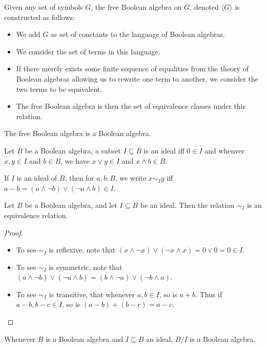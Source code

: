 \begin{definition}
  Given any set of symbols $G$, the free Boolean algebra on $G$, denoted $\langle G \rangle$
  is constructed as follows:
  \begin{itemize}
    \item We add $G$ as set of constants to the language of Boolean algebras. 
    \item We consider the set of terms in this language. 
    \item If there merely exists some finite sequence of 
      equalities from the theory of Boolean algebras allowing us to rewrite one term to another, 
      we consider the two terms to be equivalent. 
    \item The free Boolean algebra is then the set of equivalence classes under this relation. 
  \end{itemize}
\end{definition}
\begin{remark}
  The free Boolean algebra is a Boolean algebra. 
\end{remark}
\begin{definition}
  Let $B$ be a Boolean algebra, a subset $I\subseteq B$ is an ideal iff 
  $0\in I$ and whenver $x,y \in I$ and $b\in B$, we have $x\vee y \in I$ and $x \wedge b \in B$. 

  If $I$ is an ideal of $B$, then for $a,b:B$, we write $x\sim_I y$ iff 
  $a - b  = 
  (a \wedge \neg b ) \vee ( \neg a \wedge b) 
  \in I$. 
\end{definition}
\begin{lemma}
  Let $B$ be a Boolean algebra, and let $I\subseteq B$ be an ideal. 
  Then the relation $\sim_I$ is an equivalence relation. 
\end{lemma}
\begin{proof}
  \begin{itemize}
    \item To see $\sim_I$ is reflexive, note that 
      $(x \wedge \neg x) \vee (\neg x \wedge x) = 0 \vee 0 = 0 \in I$. 
    \item To see $\sim_I$ is symmetric, note that 
      $ (a \wedge \neg b) \vee ( \neg a \wedge b) = 
        (b \wedge \neg a) \vee ( \neg b \wedge a)$. 
    \item To see $\sim_I$ is transitive, that 
      whenever $a,b \in I$, so is $ a + b$. 
      Thus if $a -b , b -c \in I$, so is 
      $(a -b) + (b-c) = a -c$.
  \end{itemize}
\end{proof}
\begin{lemma}
  Whenever $B$ is a Boolean algebra and $I\subseteq B$ an ideal, 
  $B/I$ is a Boolean algebra. 
\end{lemma}
